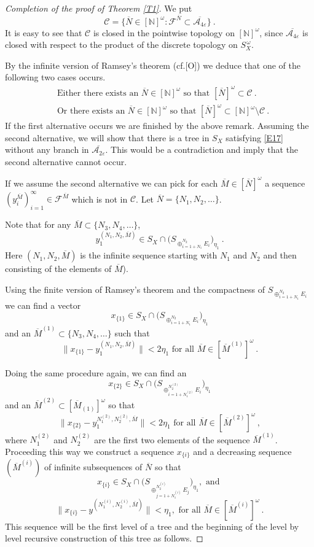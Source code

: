 \documentclass[11pt,leqno]{amsart}
\theoremstyle{definition}
\newcommand{\ds}{\displaystyle}
\newcommand{\vp}{\varepsilon}
\newcommand{\cF}{\mathcal{F}}
\newcommand{\cC}{\mathcal{C}}
\newcommand{\cA}{\mathcal{A}}
\newcommand{\N}{\mathbb{N}}
\newcommand{\iN}{[\N]^{\omega}}
\newcommand{\iNN}{[\overline{N}]^{\omega}}
\newcommand{\bN}{\overline{N}}
\newcommand{\bM}{\overline{M}}
\begin{document}
\begin{proof}[Completion of the proof of Theorem \ref{T1}]

We put 
$$\cC=\{\bN\in\iN: \cF^{\bN}\subset\overline{\cA_{4\vp}}\}\ .$$
It is easy to see that $\cC$ is closed in the pointwise topology on $\iN$, since
$\overline{\cA_{4\vp}}$ is closed with respect to the  product of the 
discrete topology on $S^{\,\omega}_X$.

By the infinite version of Ramsey's theorem (cf.[O]) we deduce that 
one of the following two cases occurs.
\begin{align*}
&\text{Either there exists an }\bN\in\iN\text{ so that }  \iNN\subset\cC\ .\\
&\text{Or there exists an }\bN\in\iN\text{ so that }\iNN\subset\iN
\setminus\cC\ .
\end{align*}
If the first alternative occurs we are finished by the above remark.
Assuming the second alternative, we will show that there is a tree 
in $S_X$ satisfying \eqref{E17} without any
branch in $\overline{\cA_{2\vp}}$. 
This would be a contradiction and imply that 
the second alternative cannot occur.

If we assume the second alternative we can pick for 
each $\bM\in\iNN$ a sequence
$(y^{\bM}_i)_{i=1}^\infty\in\cF^{\bM}$ which is not in $\cC$. 
Let $\bN=\{N_1,N_2,\ldots\}$.

Note that for any $\bM\subset\{N_3,N_4,\ldots\}$, 
$$y_1^{(N_1,N_2,\bM)}\in S_X\cap 
\bigl(S_{\ds\oplus_{i=1+N_1}^{N_2} E_i}\bigr)_{\eta_1}\ .$$
Here $(N_1,N_2,\bM)$ is the infinite sequence starting with $N_1$ 
and $N_2$ and then consisting of the elements of $\bM$).

Using the finite version of Ramsey's theorem and the compactness of 
$S_{\ds\oplus_{i=1+N_1}^{N_2}E_i}$ we can find a vector 
$$x_{\{1\}}\in S_X\cap\bigl(S_{\ds\oplus_{i=1+N_1}^{N_2} E_i}\bigr)_{\eta_1}$$
and an $\bM^{(1)}\subset\{N_3,N_4,\ldots\}$ such that
\begin{equation}\label{E20}
\|x_{\{1\}}-y_1^{(N_1,N_2,\bM)}\|<2\eta_1\text{ for all } 
\bM\in[\bM^{(1)}]^\omega\ .
\end{equation}

Doing the same procedure again, we can find an 
$$x_{\{2\}}\in S_X\cap
\biggl(S_{\ds\oplus_{i=1+N_1^{(2)}}^{N^{(2)}_2} E_i}\biggr)_{\eta_1}$$
and an $\bM^{(2)}\subset[\bM_{(1)}]^\omega$ so that
\begin{equation*}
\|x_{\{2\}}-y_1^{N_1^{(2)},N_2^{(2)},\bM}\|
< 2\eta_1\text{ for all } \bM\in[\bM^{(2)}]^\omega\ ,
\end{equation*}
where $N_1^{(2)}$ and $N_2^{(2)}$ are the first two elements of 
the sequence $\bM^{(1)}$. 
Proceeding this way we construct a sequence
$x_{\{i\}}$ and a decreasing sequence $(\bM^{(i)})$ of infinite 
subsequences of $\bN$ so that
$$x_{\{i\}}\in S_X\cap\bigl(S_{\ds\oplus_{j=1+N_1^{(i)}}^{N^{(i)}_2} E_j}\bigr)_{\eta_1},\text{ and }$$
$$\|x_{\{i\}}-y^{(N^{(i)}_1,N^{(i)}_2,\bM)}\|<\eta_1,
\text{ for all }\bM\in[\bM^{(i)}]^\omega\ .$$
This sequence will be the first level of a tree and the beginning of the 
level by level recursive construction of this tree as follows.


\end{proof}
\end{document}
